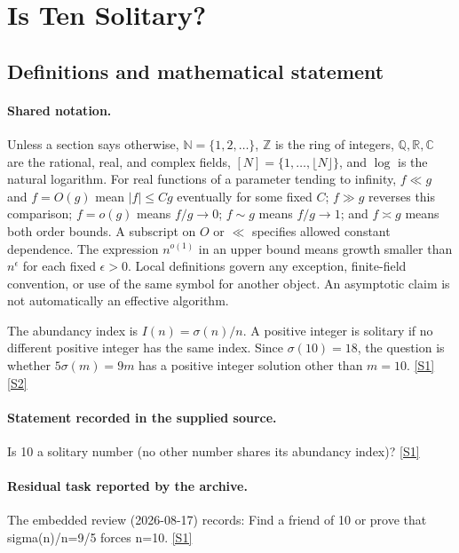 \documentclass[11pt,a4paper]{article}
\newcommand{\N}{\mathbb{N}}
\newcommand{\Z}{\mathbb{Z}}
\newcommand{\Q}{\mathbb{Q}}
\newcommand{\R}{\mathbb{R}}
\newcommand{\C}{\mathbb{C}}
\newcommand{\sref}[2]{\hyperlink{source:#1:#2}{[S#2]}}
\begin{document}
\section{Is Ten Solitary?}\label{statement}


\subsection{Definitions and mathematical statement}

\paragraph{Shared notation.}Unless a section says otherwise, $\N=\{1,2,\ldots\}$,
$\Z$ is the ring of integers, $\Q,\R,\C$ are the rational, real, and complex
fields, $[N]=\{1,\ldots,\lfloor N\rfloor\}$, and $\log$ is the natural
logarithm. For real functions of a parameter tending to infinity,
$f\ll g$ and $f=O(g)$ mean $|f|\leq Cg$ eventually for some fixed $C$;
$f\gg g$ reverses this comparison; $f=o(g)$ means $f/g\to0$;
$f\sim g$ means $f/g\to1$; and $f\asymp g$ means both order bounds.
A subscript on $O$ or $\ll$ specifies allowed constant dependence.
The expression $n^{o(1)}$ in an upper bound means growth smaller than
$n^\epsilon$ for each fixed $\epsilon>0$. Local definitions govern any
exception, finite-field convention, or use of the same symbol for another
object. An asymptotic claim is not automatically an effective algorithm.



The abundancy index is $I(n)=\sigma(n)/n$. A positive integer is solitary if no different positive integer has the same index. Since $\sigma(10)=18$, the question is whether $5\sigma(m)=9m$ has a positive integer solution other than $m=10$. \sref{statement}{1} \sref{statement}{2}

\paragraph{Statement recorded in the supplied source.}
Is 10 a solitary number (no other number shares its abundancy index)? \sref{statement}{1}

\paragraph{Residual task reported by the archive.}

The embedded review (2026-08-17) records: Find a friend of 10 or prove that sigma(n)/n=9/5 forces n=10. \sref{statement}{1}
\end{document}
